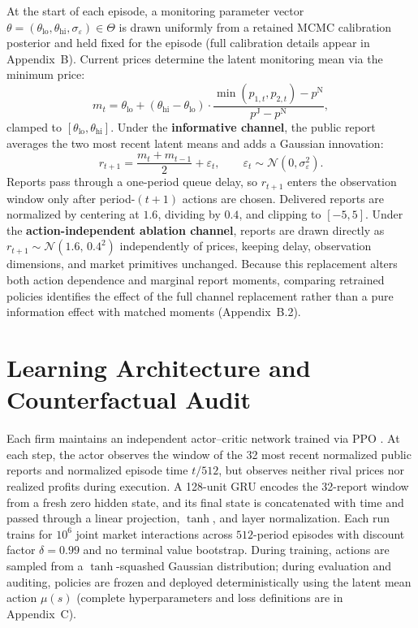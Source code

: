 \documentclass{article}
\begin{document}
At the start of each episode, a monitoring parameter vector $\theta=(\theta_{\mathrm{lo}},\theta_{\mathrm{hi}},\sigma_\varepsilon)\in\Theta$ is drawn uniformly from a retained MCMC calibration posterior and held fixed for the episode (full calibration details appear in Appendix~B). Current prices determine the latent monitoring mean via the minimum price:
\begin{equation}\label{eq:latent}
m_t = \theta_{\mathrm{lo}}
+ (\theta_{\mathrm{hi}}-\theta_{\mathrm{lo}})
\cdot \frac{\min(p_{1,t},p_{2,t})-p^{\mathrm{N}}}
{p^{\mathrm{J}}-p^{\mathrm{N}}},
\end{equation}
clamped to $[\theta_{\mathrm{lo}},\theta_{\mathrm{hi}}]$. Under the \textbf{informative channel}, the public report averages the two most recent latent means and adds a Gaussian innovation:
\begin{equation}\label{eq:report}
r_{t+1} = \frac{m_t + m_{t-1}}{2} + \varepsilon_t,\qquad
\varepsilon_t\sim\mathcal{N}(0,\sigma_\varepsilon^2).
\end{equation}
Reports pass through a one-period queue delay, so $r_{t+1}$ enters the observation window only after period-$(t+1)$ actions are chosen. Delivered reports are normalized by centering at $1.6$, dividing by $0.4$, and clipping to $[-5,5]$. Under the \textbf{action-independent ablation channel}, reports are drawn directly as $r_{t+1}\sim\mathcal{N}(1.6,\,0.4^2)$ independently of prices, keeping delay, observation dimensions, and market primitives unchanged. Because this replacement alters both action dependence and marginal report moments, comparing retrained policies identifies the effect of the full channel replacement rather than a pure information effect with matched moments (Appendix~B.2).

\section{Learning Architecture and Counterfactual Audit}

Each firm maintains an independent actor--critic network trained via PPO \citep{schulman2017proximal}. At each step, the actor observes the window of the 32 most recent normalized public reports and normalized episode time $t/512$, but observes neither rival prices nor realized profits during execution. A 128-unit GRU encodes the 32-report window from a fresh zero hidden state, and its final state is concatenated with time and passed through a linear projection, $\tanh$, and layer normalization. Each run trains for $10^6$ joint market interactions across $512$-period episodes with discount factor $\delta=0.99$ and no terminal value bootstrap. During training, actions are sampled from a $\tanh$-squashed Gaussian distribution; during evaluation and auditing, policies are frozen and deployed deterministically using the latent mean action $\mu(s)$ (complete hyperparameters and loss definitions are in Appendix~C).
\end{document}
